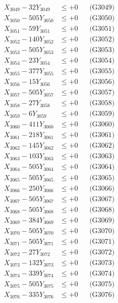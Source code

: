 \documentclass[a4paper,10pt]{article}
\begin{document}
{\begin{align}
X_{3049} - 32Y_{3049} &\leq +0 && \text{(G3049)} \\
X_{3050} - 505Y_{3050} &\leq +0 && \text{(G3050)} \\
\allowbreak
X_{3051} - 59Y_{3051} &\leq +0 && \text{(G3051)} \\
X_{3052} - 140Y_{3052} &\leq +0 && \text{(G3052)} \\
X_{3053} - 505Y_{3053} &\leq +0 && \text{(G3053)} \\
X_{3054} - 23Y_{3054} &\leq +0 && \text{(G3054)} \\
X_{3055} - 377Y_{3055} &\leq +0 && \text{(G3055)} \\
X_{3056} - 15Y_{3056} &\leq +0 && \text{(G3056)} \\
X_{3057} - 505Y_{3057} &\leq +0 && \text{(G3057)} \\
X_{3058} - 27Y_{3058} &\leq +0 && \text{(G3058)} \\
X_{3059} - 6Y_{3059} &\leq +0 && \text{(G3059)} \\
X_{3060} - 411Y_{3060} &\leq +0 && \text{(G3060)} \\
\allowbreak
X_{3061} - 218Y_{3061} &\leq +0 && \text{(G3061)} \\
X_{3062} - 145Y_{3062} &\leq +0 && \text{(G3062)} \\
X_{3063} - 103Y_{3063} &\leq +0 && \text{(G3063)} \\
X_{3064} - 505Y_{3064} &\leq +0 && \text{(G3064)} \\
X_{3065} - 505Y_{3065} &\leq +0 && \text{(G3065)} \\
X_{3066} - 250Y_{3066} &\leq +0 && \text{(G3066)} \\
X_{3067} - 505Y_{3067} &\leq +0 && \text{(G3067)} \\
X_{3068} - 505Y_{3068} &\leq +0 && \text{(G3068)} \\
X_{3069} - 384Y_{3069} &\leq +0 && \text{(G3069)} \\
X_{3070} - 505Y_{3070} &\leq +0 && \text{(G3070)} \\
\allowbreak
X_{3071} - 505Y_{3071} &\leq +0 && \text{(G3071)} \\
X_{3072} - 27Y_{3072} &\leq +0 && \text{(G3072)} \\
X_{3073} - 132Y_{3073} &\leq +0 && \text{(G3073)} \\
X_{3074} - 339Y_{3074} &\leq +0 && \text{(G3074)} \\
X_{3075} - 505Y_{3075} &\leq +0 && \text{(G3075)} \\
X_{3076} - 335Y_{3076} &\leq +0 && \text{(G3076)} \\

\end{align}}
\end{document}
